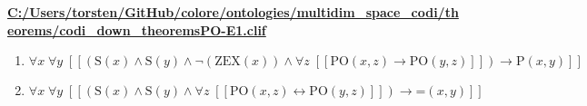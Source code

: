 \documentclass{article}
\begin{document}
\textbf{\url{C:/Users/torsten/GitHub/colore/ontologies/multidim\_space\_codi/theorems/codi\_down\_theoremsPO-E1.clif}}

\begin{enumerate}
\item $\forall x\; \forall y\;  \left[ \left[ \left(\textrm{S}(x) \land \textrm{S}(y) \land \neg \left(\textrm{ZEX}(x)\right) \land \forall z\;  \left[ \left[ \textrm{PO}(x,z) \rightarrow \textrm{PO}(y,z) \right] \right]\right) \rightarrow \textrm{P}(x,y) \right] \right]$
\item $\forall x\; \forall y\;  \left[ \left[ \left(\textrm{S}(x) \land \textrm{S}(y) \land \forall z\;  \left[ \left[ \textrm{PO}(x,z) \leftrightarrow \textrm{PO}(y,z) \right] \right]\right) \rightarrow \textrm{=}(x,y) \right] \right]$
\end{enumerate}
\end{document}
